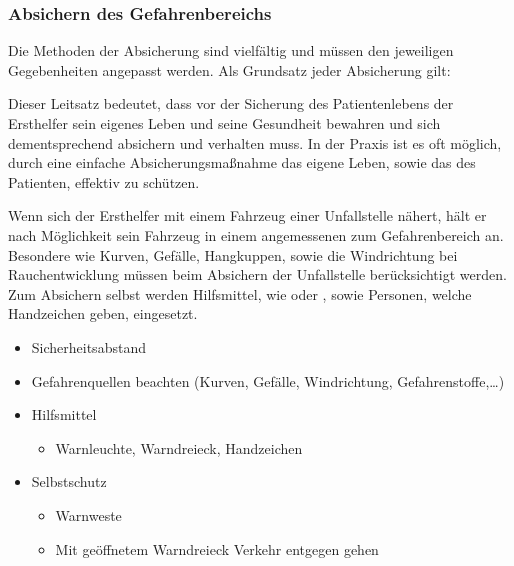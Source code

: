 \subsubsection{Absichern des Gefahrenbereichs}

Die Methoden der Absicherung sind vielfältig und müssen den jeweiligen
Gegebenheiten angepasst werden. Als Grundsatz jeder
Absicherung gilt:


Dieser Leitsatz bedeutet, dass vor der Sicherung des
Patientenlebens der Ersthelfer sein eigenes Leben und seine Gesundheit bewahren und sich dementsprechend
absichern und verhalten muss.
In der Praxis ist es oft möglich, durch
eine einfache Absicherungsmaßnahme das eigene Leben, sowie
das des Patienten, effektiv zu schützen.

{

Wenn sich der Ersthelfer mit einem Fahrzeug einer
Unfallstelle nähert, hält er nach Möglichkeit sein
Fahrzeug in einem angemessenen  zum Gefahrenbereich an.
Besondere  wie Kurven,
Gefälle, Hangkuppen, sowie die Windrichtung bei
Rauchentwicklung müssen beim Absichern der Unfallstelle
berücksichtigt werden. Zum Absichern selbst werden
Hilfsmittel, wie  oder , sowie
Personen, welche Handzeichen geben, eingesetzt. 
}{
\begin{itemize}
    \item Sicherheitsabstand
    \item Gefahrenquellen beachten (Kurven, Gefälle,
    Windrichtung, Gefahrenstoffe,\ldots)
    \item Hilfsmittel
    \begin{itemize}
    \item Warnleuchte, Warndreieck, Handzeichen
    \end{itemize}
    \item Selbstschutz
    \begin{itemize}
        \item Warnweste
        \item Mit geöffnetem Warndreieck
         Verkehr entgegen gehen        
    \end{itemize}
\end{itemize}
}{}{}{}



